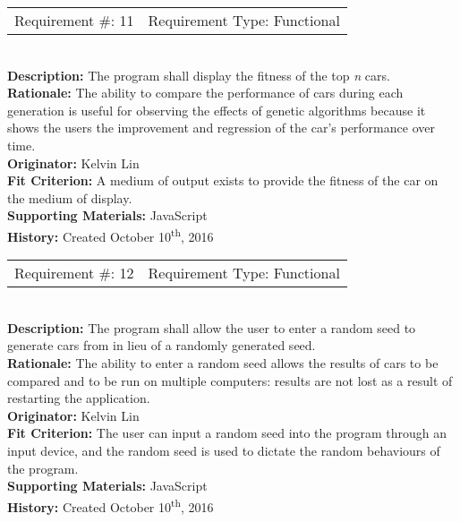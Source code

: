 \documentclass[12pt, titlepage]{article}
\begin{document}
\begin{reqbox}
%
\begin{tabular}{cc}
Requirement \#: 11 & Requirement Type: Functional \\
\end{tabular} \\
%
\textbf{Description:} The program shall display the fitness of the top 
\textit{n} cars. \\
\textbf{Rationale:} The ability to compare the performance of cars during each 
generation is useful for observing the effects of genetic algorithms because it 
shows the users the improvement and regression of the car's performance over 
time.\\
\textbf{Originator:} Kelvin Lin\\
\textbf{Fit Criterion:} A medium of output exists to provide the fitness of the 
car on the medium of display.\\
%  
\textbf{Supporting Materials:} JavaScript \\
\textbf{History:} Created October 10\textsuperscript{th}, 2016
%
\end{reqbox}

\newpage

\begin{reqbox}
%
\begin{tabular}{cc}
Requirement \#: 12 & Requirement Type: Functional \\
\end{tabular} \\
%
\textbf{Description:} The program shall allow the user to enter a random seed to 
generate cars from in lieu of a randomly generated seed. \\
\textbf{Rationale:} The ability to enter a random seed allows the results of 
cars to be compared and to be run on multiple computers: results are not lost as 
a result of restarting the application. \\
\textbf{Originator:} Kelvin Lin\\
\textbf{Fit Criterion:} The user can input a random seed into the program 
through an input device, and the random seed is used to dictate the random 
behaviours of the program.\\
%  
\textbf{Supporting Materials:} JavaScript \\
\textbf{History:} Created October 10\textsuperscript{th}, 2016
%
\end{reqbox}
\end{document}
